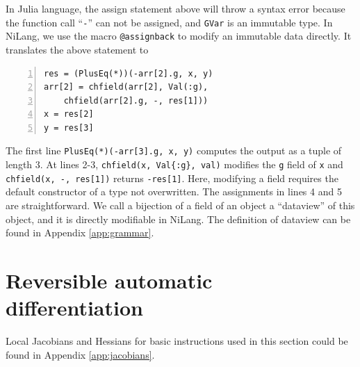\documentclass{article}
\newcommand{\<}{\langle}
\renewcommand{\>}{\rangle}
\newcommand{\App}[1]{Appendix \ref{#1}}
\theoremstyle{definition}\newtheorem{definition}{\textit{Definition}}
\begin{document}
In Julia language, the assign statement above will throw a syntax error because the function call ``\texttt{-}'' can not be assigned, and \texttt{GVar} is an immutable type.
In NiLang, we use the macro \texttt{@assignback} to modify an immutable data directly. It translates the above statement to

\begin{minipage}{.88\columnwidth}
\begin{lstlisting}[numberstyle=\scriptsize\color{gray},numbers=left,numbersep=8pt]
res = (PlusEq(*))(-arr[2].g, x, y)
arr[2] = chfield(arr[2], Val(:g),
    chfield(arr[2].g, -, res[1]))
x = res[2]
y = res[3]
\end{lstlisting}
\end{minipage}

The first line \texttt{PlusEq(*)(-arr[3].g, x, y)} computes the output as a tuple of length $3$.
At lines 2-3, \texttt{chfield(x, Val\{:g\}, val)} modifies the \texttt{g} field of \texttt{x} and \texttt{chfield(x, -, res[1])} returns \texttt{-res[1]}. Here, modifying a field requires the default constructor of a type not overwritten.
The assignments in lines 4 and 5 are straightforward.
We call a bijection of a field of an object a ``dataview'' of this object, and it is directly modifiable in NiLang.
The definition of dataview can be found in \App{app:grammar}.

\section{Reversible automatic differentiation}\label{sec:bp}

Local Jacobians and Hessians for basic instructions used in this section could be found in \App{app:jacobians}.
\end{document}

